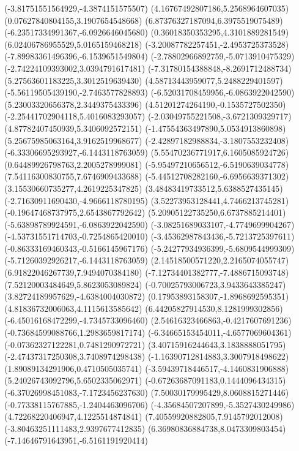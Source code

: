 {(-3.81751551564929,-4.3874151575507)
(4.16767492807186,5.2568964607035)
(0.07627840804155,3.1907654548668)
(6.87376327187094,6.3975519075489)
(-6.23517334991367,-6.0926646045680)
(0.36018350353295,4.3101889281549)
(6.02406786955529,5.0165159468218)
(-3.20087782257451,-2.4953725373528)
(-7.89983361496396,-6.1539651549804)
(-2.78802966892759,-5.0713910475329)
(-2.74224109393002,3.0394791617481)
(-7.31780154388848,-8.2691712488734)
(5.27563601183225,3.3012519639430)
(4.58713443959077,5.2488229401597)
(-5.56119505439190,-2.7463577828893)
(-6.52031708459956,-6.0863922042590)
(5.23003320656378,2.3449375433396)
(4.51201274264190,-0.1535727502350)
(-2.25441702904118,5.4016083293057)
(-2.03049755221508,-3.6721309329717)
(4.87782407450939,5.3406092572151)
(-1.47554363497890,5.0534913860898)
(5.25675985063164,3.9162519968677)
(-2.42897182988834,-3.1807553232408)
(-6.33306695293927,-6.1443118763059)
(5.55470236771917,6.1605085924726)
(0.64489926798763,2.2005278999081)
(-5.95497210656512,-6.5190639034778)
(7.54116300830755,7.6746909433688)
(-5.44512708282160,-6.6956639371302)
(3.15530660735277,4.2619225347825)
(3.48483419733512,5.6388527435145)
(-2.71630911690430,-4.9666118780195)
(3.52273953128441,4.7466213745281)
(-0.19647468737975,2.6543867792642)
(5.20905122735250,6.6737885214401)
(-5.63898789924591,-6.0863922042590)
(-3.08251689033107,-4.7749699904267)
(-4.53731551714703,-0.7254865420010)
(-3.45362987843436,-5.7213725397611)
(-0.86333169460343,-0.5166145967176)
(-5.24277934936399,-5.6809544999309)
(-5.71260392926217,-6.1443118763059)
(2.14518500571220,2.2165074055747)
(6.91822046267739,7.9494070384180)
(-7.12734401382777,-7.4886715093748)
(7.52120003484649,5.8623053089824)
(-0.70025793006723,3.9433643385247)
(3.82724189957629,-4.6384004030872)
(0.17953893158307,-1.8968692595351)
(4.81836732006063,4.1115613585642)
(6.44205827914530,8.1281999302856)
(-6.45016168472299,-4.7345733096460)
(2.54616323466863,-0.4217607691236)
(-0.73684599088766,1.2983659817174)
(-6.34665153454011,-4.6577069604361)
(-0.07362327122281,0.7481290972721)
(3.40715916244643,3.1838888051795)
(-2.47437317250308,3.7408974298438)
(-1.16390712814883,3.3007918498622)
(1.89089134291906,0.4710505035741)
(-3.59439718446517,-4.1460831906888)
(5.24026743092796,5.6502335062971)
(-0.67263687091183,0.1444096434315)
(-6.37026998451083,-7.1723456237630)
(7.50030179995429,8.0608815271446)
(-0.77338115767885,-1.2404463096706)
(-4.35684507207899,-5.3527430249986)
(4.72268220406947,4.1225514874841)
(7.40559920882805,7.9145792012008)
(-3.80463251111483,2.9397677412835)
(6.36980836884738,8.0473309803454)
(-7.14646791643951,-6.5161191920414)
}
